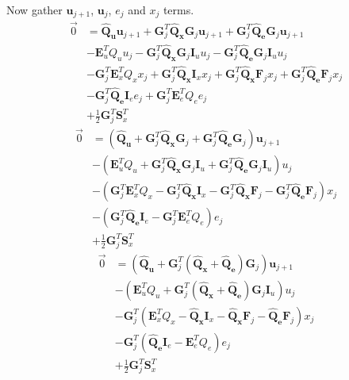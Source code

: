 \documentclass[landscape]{article}
\begin{document}
Now gather $\mathbf{u}_{j+1}$, $\mathbf{u}_{j}$, $e_j$ and $x_j$ terms.
\begin{align}
\vec{0}
& 
= \mathbf{\hat{Q}_u} \mathbf{u}_{j+1} 
+ \mathbf{G}_j^T \mathbf{\hat{Q}_x} \mathbf{G}_j \mathbf{u}_{j+1} 
+ \mathbf{G}_j^T \mathbf{\hat{Q}_e} \mathbf{G}_j \mathbf{u}_{j+1} \\
& 
- \mathbf{E}_u^T Q_u u_j
- \mathbf{G}_j^T \mathbf{\hat{Q}_x} \mathbf{G}_j \mathbf{I}_u u_j  
- \mathbf{G}_j^T \mathbf{\hat{Q}_e} \mathbf{G}_j \mathbf{I}_u u_j \\
& 
- \mathbf{G}_j^T \mathbf{E}_x^T Q_x x_j
+ \mathbf{G}_j^T \mathbf{\hat{Q}_x} \mathbf{I}_x x_j 
+ \mathbf{G}_j^T \mathbf{\hat{Q}_x} \mathbf{F}_j x_j 
+ \mathbf{G}_j^T \mathbf{\hat{Q}_e} \mathbf{F}_j x_j\\
&
- \mathbf{G}_j^T \mathbf{\hat{Q}_e} \mathbf{I}_e e_j 
+ \mathbf{G}_j^T \mathbf{E}_e^T Q_e e_j\\
& + \frac{1}{2} \mathbf{G}_j^T \mathbf{S}_x^T
\end{align}
\begin{align}
\vec{0}
& 
=
\left(
\mathbf{\hat{Q}_u}
+ \mathbf{G}_j^T \mathbf{\hat{Q}_x} \mathbf{G}_j 
+ \mathbf{G}_j^T \mathbf{\hat{Q}_e} \mathbf{G}_j 
\right) \mathbf{u}_{j+1} \\
& 
- 
\left(
\mathbf{E}_u^T Q_u 
+ \mathbf{G}_j^T \mathbf{\hat{Q}_x} \mathbf{G}_j \mathbf{I}_u 
+ \mathbf{G}_j^T \mathbf{\hat{Q}_e} \mathbf{G}_j \mathbf{I}_u 
\right) u_j \\
&
-
\left(
 \mathbf{G}_j^T \mathbf{E}_x^T Q_x 
- \mathbf{G}_j^T \mathbf{\hat{Q}_x} \mathbf{I}_x  
- \mathbf{G}_j^T \mathbf{\hat{Q}_x} \mathbf{F}_j  
- \mathbf{G}_j^T \mathbf{\hat{Q}_e} \mathbf{F}_j 
\right) x_j\\
&
-
\left( \mathbf{G}_j^T \mathbf{\hat{Q}_e} \mathbf{I}_e 
- \mathbf{G}_j^T \mathbf{E}_e^T Q_e 
\right) e_j\\
& + \frac{1}{2} \mathbf{G}_j^T \mathbf{S}_x^T
\end{align}
\begin{align}
\vec{0}
& 
=
\left(
\mathbf{\hat{Q}_u}
+ \mathbf{G}_j^T \left(\mathbf{\hat{Q}_x} + \mathbf{\hat{Q}_e} \right)\mathbf{G}_j 
\right) \mathbf{u}_{j+1} \\
& 
- 
\left(
\mathbf{E}_u^T Q_u 
+ \mathbf{G}_j^T \left(\mathbf{\hat{Q}_x} +  \mathbf{\hat{Q}_e} \right) \mathbf{G}_j \mathbf{I}_u 
\right) u_j \\
&
- \mathbf{G}_j^T
\left(
\mathbf{E}_x^T Q_x 
- \mathbf{\hat{Q}_x} \mathbf{I}_x  
- \mathbf{\hat{Q}_x} \mathbf{F}_j  
- \mathbf{\hat{Q}_e} \mathbf{F}_j 
\right) x_j\\
&
-\mathbf{G}_j^T
\left( \mathbf{\hat{Q}_e} \mathbf{I}_e  
- \mathbf{E}_e^T Q_e 
\right) e_j\\
& + \frac{1}{2} \mathbf{G}_j^T \mathbf{S}_x^T
\end{align}
\end{document}
